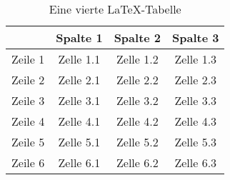 
\begin{table}[h!]
\begin{center}
\begin{tabular}{l|c|c|c}
          & Spalte 1                      &     Spalte 2                 &      Spalte 3                   \\
\hline
Zeile 1   & \cellcolor{gray!50}Zelle 1.1 & \cellcolor{gray!50}Zelle 1.2  & \cellcolor{gray!50}Zelle 1.3    \\
\hline
Zeile 2   & Zelle 2.1                    & Zelle 2.2                     & Zelle 2.3 \\
\hline
Zeile 3   & \cellcolor{gray!50}Zelle 3.1 & \cellcolor{gray!50}Zelle 3.2  & \cellcolor{gray!50}Zelle 3.3    \\
\hline
Zeile 4   & Zelle 4.1                    & Zelle 4.2                     & Zelle 4.3 \\
\hline
Zeile 5   & \cellcolor{gray!50}Zelle 5.1 & \cellcolor{gray!50}Zelle 5.2  & \cellcolor{gray!50}Zelle 5.3    \\
\hline
Zeile 6   & Zelle 6.1                    & Zelle 6.2                     & Zelle 6.3                       \\
\end{tabular}
\caption{Eine vierte LaTeX-Tabelle}
\end{center}
\end{table}

